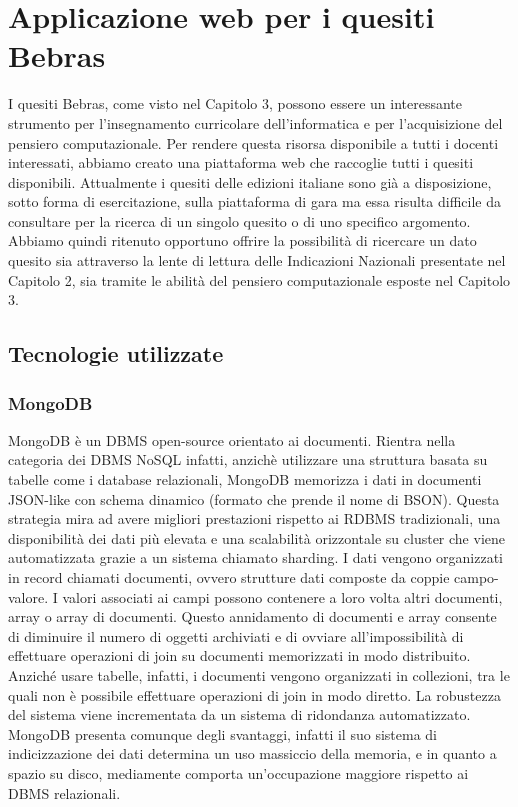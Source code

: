 \documentclass[12pt]{report}
\begin{document}
\chapter{Applicazione web per i quesiti Bebras} \label{Applicazione} 
I quesiti Bebras, come visto nel Capitolo 3, possono essere un interessante strumento per l'insegnamento curricolare dell'informatica e per l'acquisizione del pensiero computazionale. Per rendere questa risorsa disponibile a tutti i docenti interessati, abbiamo creato una piattaforma web che raccoglie tutti i quesiti disponibili.
Attualmente i quesiti delle edizioni italiane sono già a disposizione, sotto forma di esercitazione, sulla piattaforma di gara \cite{PiattaformaBebras} ma essa risulta difficile da consultare per la ricerca di un singolo quesito o di uno specifico argomento.
Abbiamo quindi ritenuto opportuno offrire la possibilità di ricercare un dato quesito sia attraverso la lente di lettura delle Indicazioni Nazionali presentate nel Capitolo 2, sia tramite le abilità del pensiero computazionale esposte nel Capitolo 3.
\section{Tecnologie utilizzate}

\subsection{MongoDB}
MongoDB \cite{mongoDB}è un DBMS open-source orientato ai documenti. Rientra nella categoria dei DBMS NoSQL infatti, anzichè utilizzare una struttura basata su tabelle come i database relazionali, MongoDB memorizza i dati in documenti JSON-like con schema dinamico (formato che prende il nome di BSON). Questa strategia mira ad avere migliori prestazioni rispetto ai RDBMS tradizionali, una disponibilità dei dati più elevata e una scalabilità orizzontale su cluster che viene automatizzata grazie a un sistema chiamato sharding. I dati vengono organizzati in record chiamati documenti, ovvero strutture dati composte da coppie campo-valore. I valori associati ai campi possono contenere a loro volta altri documenti, array o array di documenti.
Questo annidamento di documenti e array consente di diminuire il numero di oggetti archiviati e di ovviare all'impossibilità di effettuare operazioni di join su documenti memorizzati in modo distribuito. Anziché usare tabelle, infatti, i documenti vengono organizzati in collezioni, tra le quali non è possibile effettuare operazioni di join in modo diretto. La robustezza del sistema viene incrementata da un sistema di ridondanza automatizzato. MongoDB presenta comunque degli svantaggi, infatti il suo sistema di indicizzazione dei dati determina un uso massiccio della memoria, e in quanto a spazio su disco, mediamente comporta un'occupazione maggiore rispetto ai DBMS relazionali.
\end{document}

